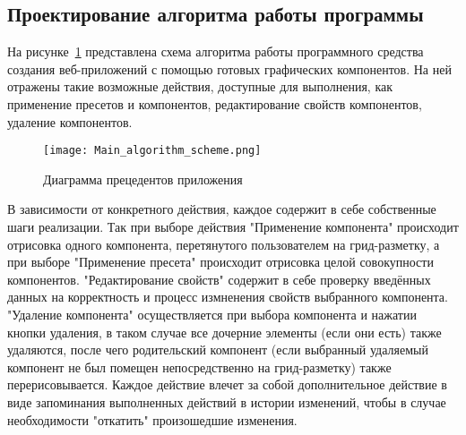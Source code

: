 \subsection{Проектирование алгоритма работы программы}
\label{sec:design:algorithm}

На рисунке~\ref{sec:design:main_algorithm_scheme} представлена схема алгоритма работы программного средства создания веб-приложений с помощью готовых графических компонентов. 
На ней отражены такие возможные действия, доступные для выполнения, как применение пресетов и компонентов, редактирование свойств компонентов, удаление компонентов. 

\begin{figure}[ht]
\centering
    \texttt{[image: Main\_algorithm\_scheme.png]}
    \caption{Диаграмма прецедентов приложения}
    \label{sec:design:main_algorithm_scheme}
\end{figure}
    
В зависимости от конкретного действия, каждое содержит в себе собственные шаги реализации. 
Так при выборе действия "Применение компонента" происходит отрисовка одного компонента, перетянутого пользователем на грид-разметку, а при выборе "Применение пресета" происходит отрисовка целой совокупности компонентов. "Редактирование свойств" содержит в себе проверку введённых данных на корректность и процесс измненения свойств выбранного компонента. "Удаление компонента" осуществляется при выбора компонента и нажатии кнопки удаления, в таком случае все дочерние элементы (если они есть) также удаляются, после чего родительский компонент (если выбранный удаляемый компонент не был помещен непосредственно на грид-разметку) также перерисовывается. Каждое действие влечет за собой дополнительное действие в виде запоминания выполненных действий в истории изменений, чтобы в случае необходимости "откатить" произошедшие изменения.
